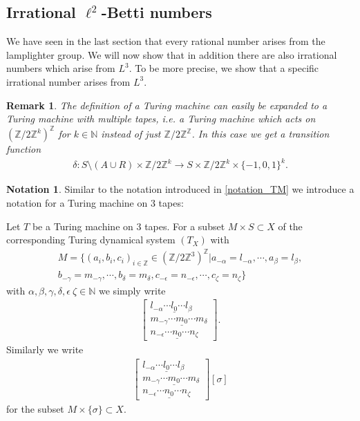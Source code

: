 \documentclass[12pt,a4paper]{scrartcl}
\theoremstyle{plain}
\newtheorem{Remark}[Theorem]{Remark}
\theoremstyle{definition}
\newtheorem{Notation}[Theorem]{Notation}
\newcommand{\Z}{\mathbb{Z}} %
\newcommand{\N}{\mathbb{N}} %
\newcommand{\2}{\mathbb{Z} / 2 \mathbb{Z}}
\newcommand{\1}{\bar{1}}
\newcommand{\0}{\bar{0}}
\begin{document}
\subsection{Irrational $\ell^2$-Betti numbers}
We have seen in the last section that every rational number arises from the lamplighter group. We will now show that in addition there are also irrational numbers which arise from $L^3$. To be more precise, we show that a specific irrational number arises from $L^3$.
\begin{Remark}
	The definition of a Turing machine can easily be expanded to a Turing machine with multiple tapes, i.e. a Turing machine which acts on $(\2^k)^\Z$ for $k \in \N$ instead of just $\2^\Z$. In this case we get a transition function 
	\begin{align*}
		\delta\colon S \setminus(A \cup R) \times \2^k \to S \times \2^k \times \{-1, 0, 1\}^k.
	\end{align*}
\end{Remark}
\begin{Notation}
	Similar to the notation introduced in \ref{notation_TM} we introduce a notation for a Turing machine on $3$ tapes:
	
	Let $T$ be a Turing machine on $3$ tapes. For a subset $M \times S \subset X$ of the corresponding Turing dynamical system $(T_X)$ with 
	\begin{align*}
		M = \{(a_i, b_i, c_i)_{i \in \Z} \in (\2^3)^\Z | a_{-\alpha} = l_{-\alpha}, \cdots, a_\beta = l_\beta,\\
		 b_{-\gamma} = m_{-\gamma}, \cdots, b_\delta = m_\delta, c_{-\epsilon} = n_{-\epsilon}, \cdots, c_\zeta = n_\zeta \}
	\end{align*}
	with $\alpha, \beta, \gamma, \delta, \epsilon\ \zeta \in \N$ we simply write
	\begin{align*}
		\begin{bmatrix}
			l_{-\alpha} \cdots \underline{l_0} \cdots l_\beta \\
			m_{-\gamma} \cdots \underline{m_0} \cdots m_\delta \\
			n_{-\epsilon} \cdots \underline{n_0} \cdots n_\zeta
		\end{bmatrix}.
	\end{align*}
	Similarly we write 
	\begin{align*}
		\begin{bmatrix}
			l_{-\alpha} \cdots \underline{l_0} \cdots l_\beta \\
			m_{-\gamma} \cdots \underline{m_0} \cdots m_\delta \\
			n_{-\epsilon} \cdots \underline{n_0} \cdots n_\zeta
		\end{bmatrix}[\sigma]
	\end{align*}
	for the subset $M \times \{\sigma \} \subset X$.
\end{Notation}
\end{document}
